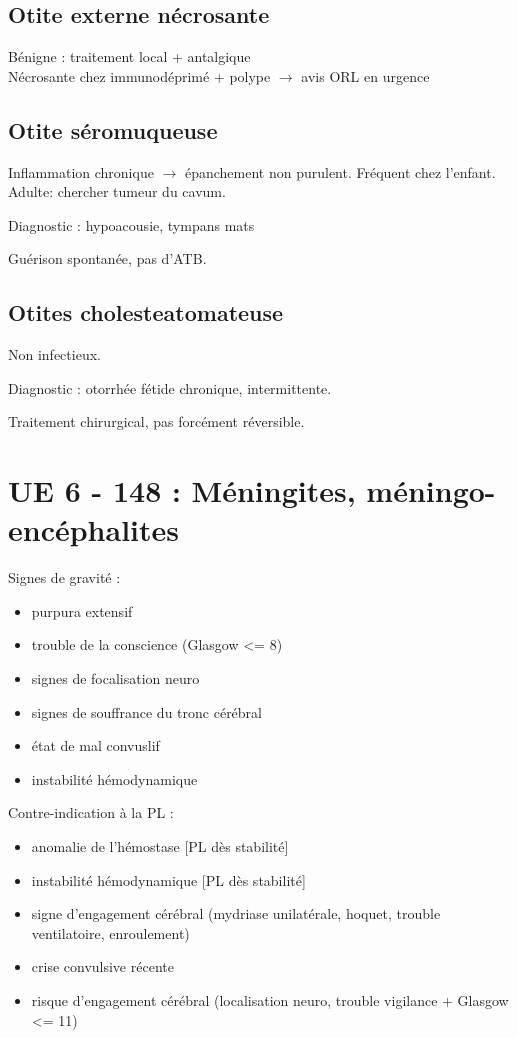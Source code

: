 \subsection{Otite externe nécrosante}%
\label{sub:otite_externe_necrosante}

Bénigne : traitement local + antalgique\\
Nécrosante chez immunodéprimé + polype $\to$ avis ORL en urgence \skull

\subsection{Otite séromuqueuse}%
\label{sub:otite_seromuqueuse}
Inflammation chronique $\rightarrow$ épanchement non purulent. Fréquent chez
l'enfant. Adulte: chercher tumeur du cavum.

Diagnostic : hypoacousie, tympans mats

Guérison spontanée, pas d'ATB.

\subsection{Otites cholesteatomateuse}%
\label{sub:otites_choestatomateuse}
Non infectieux. 

Diagnostic : otorrhée fétide chronique, intermittente.

Traitement chirurgical, pas forcément réversible.


\section{UE 6 - 148 : Méningites, méningo-encéphalites}

Signes de gravité :

\begin{itemize}
\item purpura extensif
\item trouble de la conscience (Glasgow \textless{}= 8)
\item signes de focalisation neuro
\item signes de souffrance du tronc cérébral
\item état de mal convuslif
\item instabilité hémodynamique
\end{itemize}

Contre-indication à la PL :

\begin{itemize}
\item
  anomalie de l'hémostase {[}PL dès stabilité{]}
\item
  instabilité hémodynamique {[}PL dès stabilité{]}
\item
  signe d'engagement cérébral (mydriase unilatérale, hoquet, trouble
  ventilatoire, enroulement) {}
\item
  crise convulsive récente
\item
  risque d'engagement cérébral (localisation neuro, trouble vigilance +
  Glasgow \textless{}= 11) {}
\end{itemize}

